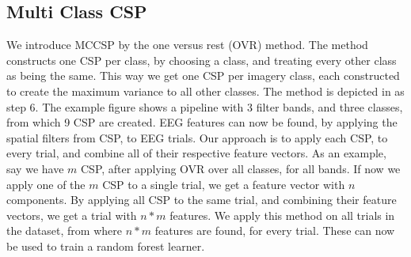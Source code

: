 \subsection{Multi Class CSP}
We introduce MCCSP by the one versus rest (OVR) method. The method constructs one CSP per class, by choosing a class, and treating every other class as being the same. This way we get one CSP per imagery class, each constructed to create the maximum variance to all other classes. The method is depicted in  as step 6. The example figure shows a pipeline with 3 filter bands, and three classes, from which 9 CSP are created. EEG features can now be found, by applying the spatial filters from CSP, to EEG trials. Our approach is to apply each CSP, to every trial, and combine all of their respective feature vectors. As an example, say we have $m$ CSP, after applying OVR over all classes, for all bands. If now we apply one of the $m$ CSP to a single trial, we get a feature vector with $n$ components. By applying all CSP to the same trial, and combining their feature vectors, we get a trial with $n * m$ features. We apply this method on all trials in the dataset, from where $n * m$ features are found, for every trial. These can now be used to train a random forest learner.     







